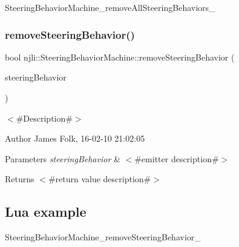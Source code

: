 \begin{DoxyCodeInclude}
\end{DoxyCodeInclude}
Steering\+Behavior\+Machine\+\_\+remove\+All\+Steering\+Behaviors\+\_\+ \mbox{\label{classnjli_1_1_steering_behavior_machine_a8a14a3f6b951ddcf05a27256c3d21efe}} 
\subsubsection{\texorpdfstring{remove\+Steering\+Behavior()}{removeSteeringBehavior()}}
{\footnotesize\ttfamily bool njli\+::\+Steering\+Behavior\+Machine\+::remove\+Steering\+Behavior (\begin{DoxyParamCaption}\item[{\mbox{\hyperlink{classnjli_1_1_steering_behavior}{Steering\+Behavior}} $\ast$}]{steering\+Behavior }\end{DoxyParamCaption})}



$<$\#\+Description\#$>$ 

\begin{DoxyAuthor}{Author}
James Folk, 16-\/02-\/10 21\+:02\+:05
\end{DoxyAuthor}

\begin{DoxyParams}{Parameters}
{\em steering\+Behavior} & $<$\#emitter description\#$>$\\
\hline
\end{DoxyParams}
\begin{DoxyReturn}{Returns}
$<$\#return value description\#$>$
\end{DoxyReturn}
\hypertarget{classnjli_1_1_steering_behavior_wander_ex1}{}\subsection{Lua example}\label{classnjli_1_1_steering_behavior_wander_ex1}

\begin{DoxyCodeInclude}
\end{DoxyCodeInclude}
Steering\+Behavior\+Machine\+\_\+remove\+Steering\+Behavior\+\_\+ \mbox{\label{classnjli_1_1_steering_behavior_machine_a1fbec43b76f0612ed5b0d2492bb4b6df}} 
